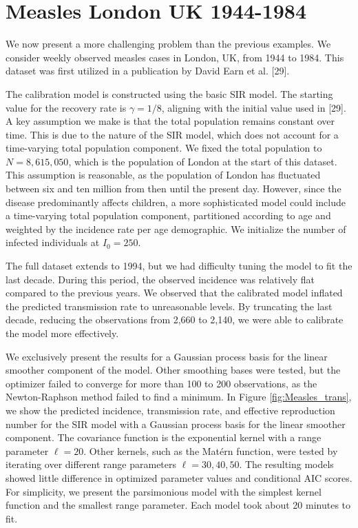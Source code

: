 \documentclass[
11pt, %
oneside, %
english, %
singlespacing, %
]{macthesis} %
\begin{document}
\section{Measles London UK 1944-1984}\label{Measles}

We now present a more challenging problem than the previous examples. We consider weekly observed measles cases in London, UK, from 1944 to 1984. This dataset was first utilized in a publication by David Earn et al. {[}29{]}.

The calibration model is constructed using the basic SIR model. The starting value for the recovery rate is \(\gamma = 1/8\), aligning with the initial value used in {[}29{]}. A key assumption we make is that the total population remains constant over time. This is due to the nature of the SIR model, which does not account for a time-varying total population component. We fixed the total population to \(N = 8,615,050\), which is the population of London at the start of this dataset. This assumption is reasonable, as the population of London has fluctuated between six and ten million from then until the present day. However, since the disease predominantly affects children, a more sophisticated model could include a time-varying total population component, partitioned according to age and weighted by the incidence rate per age demographic. We initialize the number of infected individuals at \(I_0 = 250\).

The full dataset extends to 1994, but we had difficulty tuning the model to fit the last decade. During this period, the observed incidence was relatively flat compared to the previous years. We observed that the calibrated model inflated the predicted transmission rate to unreasonable levels. By truncating the last decade, reducing the observations from 2,660 to 2,140, we were able to calibrate the model more effectively.

We exclusively present the results for a Gaussian process basis for the linear smoother component of the model. Other smoothing bases were tested, but the optimizer failed to converge for more than 100 to 200 observations, as the Newton-Raphson method failed to find a minimum. In Figure \ref{fig:Measles_trans}, we show the predicted incidence, transmission rate, and effective reproduction number for the SIR model with a Gaussian process basis for the linear smoother component. The covariance function is the exponential kernel with a range parameter \(\ell = 20\). Other kernels, such as the Matérn function, were tested by iterating over different range parameters \(\ell = 30, 40, 50\). The resulting models showed little difference in optimized parameter values and conditional AIC scores. For simplicity, we present the parsimonious model with the simplest kernel function and the smallest range parameter. Each model took about 20 minutes to fit.
\end{document}
